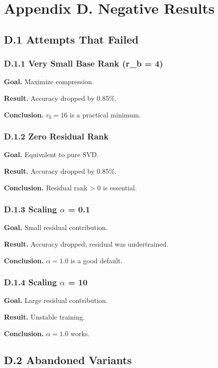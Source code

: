 \section{Appendix D. Negative Results}

\subsection{D.1 Attempts That Failed}

\subsubsection{D.1.1 Very Small Base Rank (r\_b = 4)}

\textbf{Goal.} Maximize compression.

\textbf{Result.} Accuracy dropped by 0.85\%.

\textbf{Conclusion.} $r_b = 16$ is a practical minimum.

\subsubsection{D.1.2 Zero Residual Rank}

\textbf{Goal.} Equivalent to pure SVD.

\textbf{Result.} Accuracy dropped by 0.85\%.

\textbf{Conclusion.} Residual rank \textgreater{} 0 is essential.

\subsubsection{D.1.3 Scaling $\alpha$ = 0.1}

\textbf{Goal.} Small residual contribution.

\textbf{Result.} Accuracy dropped; residual was undertrained.

\textbf{Conclusion.} $\alpha = 1.0$ is a good default.

\subsubsection{D.1.4 Scaling $\alpha$ = 10}

\textbf{Goal.} Large residual contribution.

\textbf{Result.} Unstable training.

\textbf{Conclusion.} $\alpha = 1.0$ works.

\subsection{D.2 Abandoned Variants}

